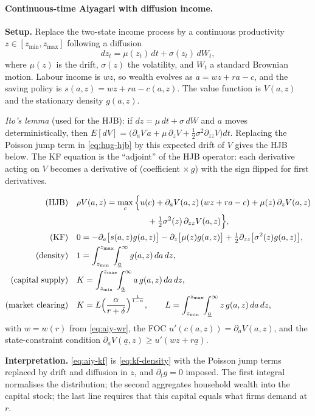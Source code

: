 \paragraph{Continuous-time Aiyagari with diffusion income.}
\textbf{Setup.} Replace the two-state income process by a continuous productivity $z\in[z_{\min},z_{\max}]$ following a diffusion
\begin{equation*}
  dz_t=\mu(z_t)\,dt+\sigma(z_t)\,dW_t,
\end{equation*}
where $\mu(z)$ is the drift, $\sigma(z)$ the volatility, and $W_t$ a standard Brownian motion. Labour income is $wz$, so wealth evolves as $\dot a=wz+ra-c$, and the saving policy is $s(a,z)=wz+ra-c(a,z)$. The value function is $V(a,z)$ and the stationary density $g(a,z)$.

\emph{Ito's lemma} (used for the HJB): if $dz=\mu\,dt+\sigma\,dW$ and $a$ moves deterministically, then $E[dV]=\big(\partial_aV\,\dot a+\mu\,\partial_zV+\tfrac12\sigma^2\partial_{zz}V\big)dt$. Replacing the Poisson jump term in \eqref{eq:hug-hjb} by this expected drift of $V$ gives the HJB below. The KF equation is the ``adjoint'' of the HJB operator: each derivative acting on $V$ becomes a derivative of (coefficient $\times\, g$) with the sign flipped for first derivatives.

\begin{keybox}[title={Aiyagari stationary system (continuous time, diffusion income)}]
\begin{align}
  \text{(HJB)}\quad & \rho V(a,z) = \max_c\Big\{u(c) + \partial_aV(a,z)\,(wz+ra-c) + \mu(z)\,\partial_zV(a,z) \notag\\
  &\hspace{8.5em} + \tfrac12\sigma^2(z)\,\partial_{zz}V(a,z)\Big\},\label{eq:aiy-hjb}\\
  \text{(KF)}\quad & 0 = -\partial_a\big[s(a,z)g(a,z)\big] - \partial_z\big[\mu(z)g(a,z)\big] + \tfrac12\partial_{zz}\big[\sigma^2(z)g(a,z)\big],\label{eq:aiy-kf}\\
  \text{(density)}\quad & 1 = \int_{z_{\min}}^{z_{\max}}\!\!\int_{\underline a}^\infty g(a,z)\,da\,dz,\label{eq:aiy-dens}\\
  \text{(capital supply)}\quad & K = \int_{z_{\min}}^{z_{\max}}\!\!\int_{\underline a}^\infty a\,g(a,z)\,da\,dz,\label{eq:aiy-Ksupply}\\
  \text{(market clearing)}\quad & K = L\Big(\frac{\alpha}{r+\delta}\Big)^{\frac{1}{1-\alpha}},\qquad L=\int_{z_{\min}}^{z_{\max}}\!\!\int_{\underline a}^\infty z\,g(a,z)\,da\,dz,\label{eq:aiy-clear}
\end{align}
with $w=w(r)$ from \eqref{eq:aiy-wr}, the FOC $u'(c(a,z))=\partial_aV(a,z)$, and the state-constraint condition $\partial_aV(\underline a,z)\ge u'(wz+r\underline a)$.
\end{keybox}
\textbf{Interpretation.} \eqref{eq:aiy-kf} is \eqref{eq:kf-density} with the Poisson jump terms replaced by drift and diffusion in $z$, and $\partial_t g=0$ imposed. The first integral normalises the distribution; the second aggregates household wealth into the capital stock; the last line requires that this capital equals what firms demand at $r$.

